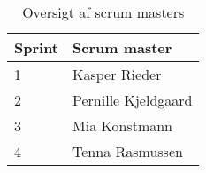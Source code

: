 \begin{table}[H]
	\centering
	\begin{tabular}{|l|l|}
		\hline
		\textbf{Sprint} & \textbf{Scrum master} \\ \hline
		1               & Kasper Rieder        \\ \hline
		2               & Pernille Kjeldgaard  \\ \hline
		3               & Mia Konstmann        \\ \hline
		4               & Tenna Rasmussen      \\ \hline
	\end{tabular}
	\caption{Oversigt af scrum masters}
	\label{table:scrumMasters}
\end{table}

